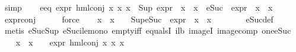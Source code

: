 \begin{isabellebody}
\ simp\isanewline
\ \ \isamarkupfalse%
\ e{}{\isacharunderscore}{\kern0pt}eq{\isacharcolon}{\kern0pt}\ {\isachardoublequoteopen}expr{\isacharunderscore}{\kern0pt}{}\ {\isacharparenleft}{\kern0pt}hml{\isacharunderscore}{\kern0pt}conj\ x{}\ x{}\ x{}{\isacharparenright}{\kern0pt}\ {\isacharequal}{\kern0pt}\ {\isacharparenleft}{\kern0pt}Sup\ {\isacharparenleft}{\kern0pt}{\isacharparenleft}{\kern0pt}expr{\isacharunderscore}{\kern0pt}{}\ {\isasymcirc}\ x{}{\isacharparenright}{\kern0pt}\ {\isacharbackquote}{\kern0pt}\ x{}\ {\isasymunion}\ {\isacharparenleft}{\kern0pt}{\isacharparenleft}{\kern0pt}eSuc\ {\isasymcirc}\ expr{\isacharunderscore}{\kern0pt}{}\ {\isasymcirc}\ x{}{\isacharparenright}{\kern0pt}\ {\isacharbackquote}{\kern0pt}\ x{}{\isacharparenright}{\kern0pt}{\isacharparenright}{\kern0pt}{\isacharparenright}{\kern0pt}{\isachardoublequoteclose}\isanewline
\ \ \ \ \isamarkupfalse%
\ expr{\isacharunderscore}{\kern0pt}{}{\isacharunderscore}{\kern0pt}conj\isanewline
\ \ \ \ \isamarkupfalse%
\ force\isanewline
\ \ \isamarkupfalse%
\ {\isachardoublequoteopen}{\isacharparenleft}{\kern0pt}x{}\ {\isacharbackquote}{\kern0pt}\ x{}\ {\isasymnoteq}\ {\isacharbraceleft}{\kern0pt}{\isacharbraceright}{\kern0pt}{\isacharparenright}{\kern0pt}\ {\isasymlongrightarrow}\ Sup{\isacharparenleft}{\kern0pt}{\isacharparenleft}{\kern0pt}{\isacharparenleft}{\kern0pt}eSuc\ {\isasymcirc}\ expr{\isacharunderscore}{\kern0pt}{}\ {\isasymcirc}\ x{}{\isacharparenright}{\kern0pt}\ {\isacharbackquote}{\kern0pt}\ x{}{\isacharparenright}{\kern0pt}{\isacharparenright}{\kern0pt}\ {\isasymge}\ {}{\isachardoublequoteclose}\isanewline
\ \ \ \ \isamarkupfalse%
\ eSuc{\isacharunderscore}{\kern0pt}def\ \isanewline
\ \ \ \ \isamarkupfalse%
\ {\isacharparenleft}{\kern0pt}metis\ eSuc{\isacharunderscore}{\kern0pt}Sup\ eSuc{\isacharunderscore}{\kern0pt}ile{\isacharunderscore}{\kern0pt}mono\ empty{\isacharunderscore}{\kern0pt}iff\ equals{}I\ i{}{\isacharunderscore}{\kern0pt}lb\ imageI\ image{\isacharunderscore}{\kern0pt}comp\ one{\isacharunderscore}{\kern0pt}eSuc{\isacharparenright}{\kern0pt}\isanewline
\ \ \isamarkupfalse%
\ {\isachardoublequoteopen}{\isacharparenleft}{\kern0pt}x{}\ {\isacharbackquote}{\kern0pt}\ x{}\ {\isasymnoteq}\ {\isacharbraceleft}{\kern0pt}{\isacharbraceright}{\kern0pt}{\isacharparenright}{\kern0pt}\ {\isasymlongrightarrow}\ {\isacharparenleft}{\kern0pt}expr{\isacharunderscore}{\kern0pt}{}\ {\isacharparenleft}{\kern0pt}hml{\isacharunderscore}{\kern0pt}conj\ x{}\ x{}\ x{}{\isacharparenright}{\kern0pt}\ {\isasymge}\ {}{\isacharparenright}{\kern0pt}{\isachardoublequoteclose}\isanewline

\end{isabellebody}
